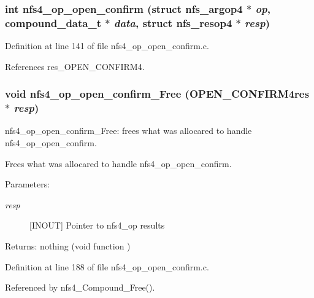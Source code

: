 \subsubsection{\setlength{\rightskip}{0pt plus 5cm}int nfs4\_\-op\_\-open\_\-confirm (struct nfs\_\-argop4 $\ast$ {\em op}, compound\_\-data\_\-t $\ast$ {\em data}, struct nfs\_\-resop4 $\ast$ {\em resp})}\label{nfs4__op__open__confirm_8c_a2}




Definition at line 141 of file nfs4\_\-op\_\-open\_\-confirm.c.

References res\_\-OPEN\_\-CONFIRM4.
\subsubsection{\setlength{\rightskip}{0pt plus 5cm}void nfs4\_\-op\_\-open\_\-confirm\_\-Free (OPEN\_\-CONFIRM4res $\ast$ {\em resp})}\label{nfs4__op__open__confirm_8c_a3}


nfs4\_\-op\_\-open\_\-confirm\_\-Free: frees what was allocared to handle nfs4\_\-op\_\-open\_\-confirm.

Frees what was allocared to handle nfs4\_\-op\_\-open\_\-confirm.

\begin{Desc}
\item[Parameters:]
\begin{description}
\item[{\em resp}][INOUT] Pointer to nfs4\_\-op results\end{description}
\end{Desc}
\begin{Desc}
\item[Returns:]nothing (void function ) \end{Desc}


Definition at line 188 of file nfs4\_\-op\_\-open\_\-confirm.c.

Referenced by nfs4\_\-Compound\_\-Free().